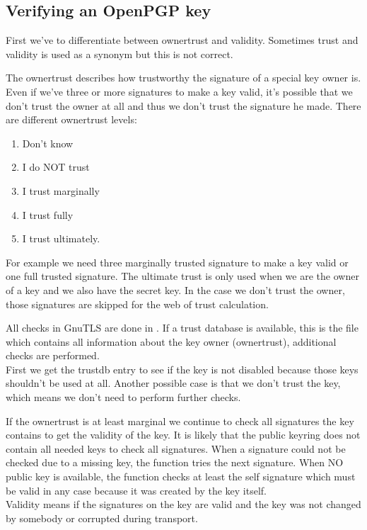 \subsection{Verifying an OpenPGP key}
First we've to differentiate between ownertrust and validity. Sometimes trust
and validity is used as a synonym but this is not correct.
\par
The ownertrust describes how trustworthy the signature of a special
key owner is. Even if we've three or more signatures to make a key valid,
it's possible that we don't trust the owner at all and thus we don't trust 
the signature he made. There are different ownertrust levels:
\begin{enumerate}
\item Don't know
\item I do NOT trust
\item I trust marginally
\item I trust fully
\item I trust ultimately.
\end{enumerate}

For example we need three marginally trusted signature to make a key
valid or one full trusted signature. The ultimate trust is only used
when we are the owner of a key and we also have the secret key.
In the case we don't trust the owner, those signatures are skipped
for the web of trust calculation.
\par
All checks in GnuTLS are done in . 
If a trust database is available, this is the file which contains all information about the
key owner (ownertrust), additional checks are performed.
\\
First we get the trustdb entry to see if the key is not disabled because
those keys shouldn't be used at all. Another possible case is that we
don't trust the key, which means we don't need to perform further checks.
\par
If the ownertrust is at least marginal we continue to check all signatures
the key contains to get the validity of the key. It is likely that the
public keyring does not contain all needed keys to check all signatures.
When a signature could not be checked due to a missing key, the function 
tries the next signature. When NO public key is available, the function
checks at least the self signature which must be valid in any case because
it was created by the key itself.
\\
Validity means if the signatures on the key are valid and the key was not 
changed by somebody or corrupted during transport.


